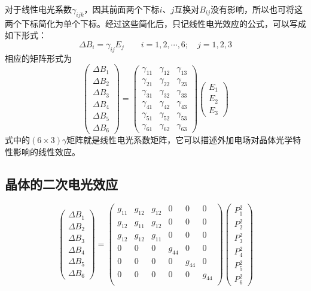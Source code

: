 \documentclass[cn,10pt,chinesefont=founder,math=mtpro2,cite=super,toc=onecol,twoside,openany]{elegantbook}
\begin{document}
对于线性电光系数$\gamma_{ijk}$，因其前面两个下标$i$、$j$互换对$B_{ij}$没有影响，所以也可将这两个下标简化为单个下标。经过这些简化后，只记线性电光效应的公式，可以写成如下形式：
\begin{equation}
\Delta B_i=\gamma_{ij}E_{j}\qquad i=1,2,\cdots,6;\quad j=1,2,3
\end{equation}
相应的矩阵形式为
\begin{equation}
\begin{pmatrix}
\Delta B_1\\
\Delta B_2\\
\Delta B_3\\
\Delta B_4\\
\Delta B_5\\
\Delta B_6
\end{pmatrix}=
\begin{pmatrix}
\gamma_{11}&\gamma_{12}&\gamma_{13}\\
\gamma_{21}&\gamma_{22}&\gamma_{23}\\
\gamma_{31}&\gamma_{32}&\gamma_{33}\\
\gamma_{41}&\gamma_{42}&\gamma_{43}\\
\gamma_{51}&\gamma_{52}&\gamma_{53}\\
\gamma_{61}&\gamma_{62}&\gamma_{63}
\end{pmatrix}
\begin{pmatrix}
E_1\\
E_2\\
E_3
\end{pmatrix}
\end{equation}
式中的$(6\times3)\gamma$矩阵就是线性电光系数矩阵，它可以描述外加电场对晶体光学特性影响的线性效应。

\subsection{晶体的二次电光效应}

\begin{equation}
\begin{pmatrix}
\Delta B_1\\
\Delta B_2\\
\Delta B_3\\
\Delta B_4\\
\Delta B_5\\
\Delta B_6
\end{pmatrix}=
\begin{pmatrix}
g_{11}&g_{12}&g_{12}&0&0&0\\
g_{12}&g_{11}&g_{12}&0&0&0\\
g_{12}&g_{12}&g_{11}&0&0&0\\
0&0&0&g_{44}&0&0\\
0&0&0&0&g_{44}&0\\
0&0&0&0&0&g_{44}\\
\end{pmatrix}
\begin{pmatrix}
P^2_1\\
P^2_2\\
P^2_3\\
P^2_4\\
P^2_5\\
P^2_6
\end{pmatrix}
\end{equation}
\end{document}
